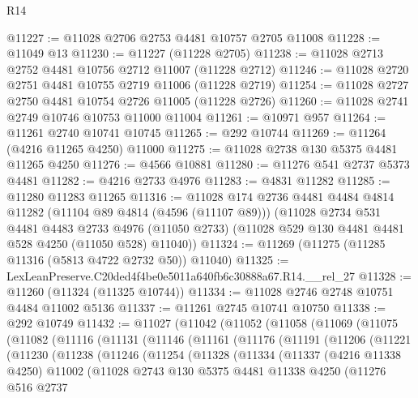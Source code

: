 \begin{lexlean}{R14}
\begin{coremodule}
@11227 := @11028 @2706 @2753 @4481 @10757 @2705 @11008
@11228 := @11049 @13
@11230 := @11227 (@11228 @2705)
@11238 := @11028 @2713 @2752 @4481 @10756 @2712 @11007 (@11228 @2712)
@11246 := @11028 @2720 @2751 @4481 @10755 @2719 @11006 (@11228 @2719)
@11254 := @11028 @2727 @2750 @4481 @10754 @2726 @11005 (@11228 @2726)
@11260 := @11028 @2741 @2749 @10746 @10753 @11000 @11004
@11261 := @10971 @957
@11264 := @11261 @2740 @10741 @10745
@11265 := @292 @10744
@11269 := @11264 (@4216 @11265 @4250) @11000
@11275 := @11028 @2738 @130 @5375 @4481 @11265 @4250
@11276 := @4566 @10881
@11280 := @11276 @541 @2737 @5373 @4481
@11282 := @4216 @2733 @4976
@11283 := @4831 @11282
@11285 := @11280 @11283 @11265
@11316 := @11028
    @174
    @2736
    @4481
    @4484
    @4814
    @11282
    (@11104 @89 @4814 (@4596 (@11107 @89)))
    (@11028
      @2734
      @531
      @4481
      @4483
      @2733
      @4976
      (@11050 @2733)
      (@11028 @529 @130 @4481 @4481 @528 @4250 (@11050 @528) @11040))
@11324 := @11269 (@11275 (@11285 @11316 (@5813 @4722 @2732 @50)) @11040)
@11325 := LexLeanPreserve.C20ded4f4be0e5011a640fb6c30888a67.R14.__rel_27
@11328 := @11260 (@11324 (@11325 @10744))
@11334 := @11028 @2746 @2748 @10751 @4484 @11002 @5136
@11337 := @11261 @2745 @10741 @10750
@11338 := @292 @10749
@11432 := @11027
    (@11042
      (@11052
        (@11058
          (@11069
            (@11075
              (@11082
                (@11116
                  (@11131
                    (@11146
                      (@11161
                        (@11176
                          (@11191
                            (@11206
                              (@11221
                                (@11230
                                  (@11238
                                    (@11246
                                      (@11254
                                        (@11328
                                          (@11334
                                            (@11337
                                              (@4216 @11338 @4250)
                                              @11002
                                              (@11028
                                                @2743
                                                @130
                                                @5375
                                                @4481
                                                @11338
                                                @4250
                                                (@11276
                                                  @516
                                                  @2737

\end{coremodule}
\end{lexlean}
